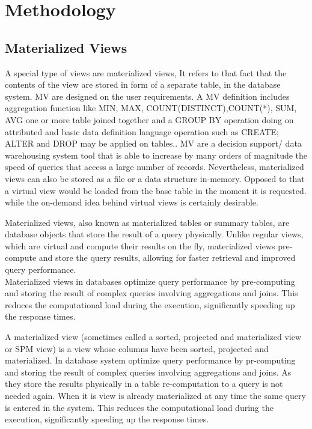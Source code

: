 \section{Methodology}\vspace{.4cm}
\subsection{Materialized Views}
 A special type of views are materialized views, It refers to that fact that the contents of the view are stored in form of a separate table, in the database system. MV are designed on the user requirements. A MV definition includes aggregation function like MIN, MAX, COUNT(DISTINCT),COUNT(*), SUM, AVG one or more table joined together and a GROUP BY operation doing on attributed and basic data definition language operation such as CREATE; ALTER and DROP may be applied on tables.\cite{Kardel_Thakare}. MV are a decision support/ data warehousing system tool that is able to increase by many orders of magnitude the speed of queries that access a large number of records.\cite{Kishan_Sainath_no_date} Nevertheless, materialized views can also be stored as a file or a data structure in-memory. Opposed to that a virtual view would be loaded from the base table in the moment it is requested. while the on-demand idea behind virtual views is certainly desirable.\cite{jan-no-date,ashadevi-2024}

\begin{definition}
Materialized views, also known as materialized tables or summary tables, are database objects that store the result of a query physically. Unlike regular views, which are virtual and compute their results on the fly, materialized views pre-compute and store the query results, allowing for faster retrieval and improved query performance.\\
Materialized views in databases optimize query performance by pre-computing and storing the result of complex queries involving aggregations and joins. This reduces the computational load during the execution, significantly speeding up the response times.

\end{definition}

A materialized view (sometimes called a sorted, projected and materialized view or SPM view) is a view whose columns have been sorted, projected and materialized.\cite{IBM} In database system optimize query performance by pr-computing and storing the result of complex queries involving aggregations and joins. As they store the results physically in a table re-computation to a query is not needed again. When it is view is already materialized at any time the same query is entered in the system. This reduces the computational load during the execution, significantly speeding up the response times.\vspace{.4cm}


